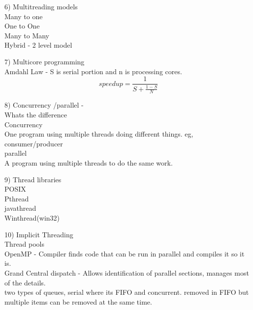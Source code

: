 \documentclass[a4paper,10pt,titlepage]{report}
\begin{document}
6) Multitreading models\\
\hspace{10mm} Many to one \\
\hspace{10mm} One to One \\
\hspace{10mm} Many to Many \\	
\hspace{10mm} Hybrid - 2 level model \\
\vspace{5mm}

7) Multicore programming \\
\hspace{10mm} Amdahl Law - S is serial portion and n is processing cores.
\begin{equation}
speedup = \frac{1}{S+\frac{1-S}{N}}
\end{equation}
\vspace{5mm}

8) Concurrency /parallel - \\
\hspace{10mm} Whats the difference\\
\hspace{15mm} Concurrency \\
\hspace{20mm} One program using multiple threads doing different things. eg, consumer/producer \\
\hspace{15mm} parallel \\
\hspace{20mm} A program using multiple threads to do the same work. \\
\vspace{5mm}

9) Thread libraries \\
\hspace{10mm} POSIX \\
\hspace{10mm} Pthread \\
\hspace{10mm} javathread \\
\hspace{10mm} Winthread(win32) \\
\vspace{5mm}

10) Implicit Threading \\
\hspace{10mm} Thread pools \\
\hspace{10mm} OpenMP - Compiler finds code that can be run in parallel and compiles it so it is. \\
\hspace{10mm} Grand Central dispatch - Allows identification of parallel sections, manages most of the details. \\
\hspace{15mm} two types of queues, serial where its FIFO and concurrent. removed in FIFO but multiple items can be removed at the same time. \\
\vspace{5mm}
\end{document}
